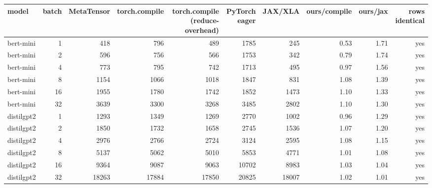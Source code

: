 \begin{tabular}{lrrrrrrrrr}
\toprule
model & batch & MetaTensor & torch.compile & torch.compile (reduce-overhead) & PyTorch eager & JAX/XLA & ours/compile & ours/jax & rows identical \\
\midrule
bert-mini & 1 & 418 & 796 & 489 & 1785 & 245 & 0.53 & 1.71 & yes \\
bert-mini & 2 & 596 & 756 & 566 & 1753 & 342 & 0.79 & 1.74 & yes \\
bert-mini & 4 & 773 & 795 & 742 & 1713 & 495 & 0.97 & 1.56 & yes \\
bert-mini & 8 & 1154 & 1066 & 1018 & 1847 & 831 & 1.08 & 1.39 & yes \\
bert-mini & 16 & 1955 & 1780 & 1742 & 1852 & 1473 & 1.10 & 1.33 & yes \\
bert-mini & 32 & 3639 & 3300 & 3268 & 3485 & 2802 & 1.10 & 1.30 & yes \\
distilgpt2 & 1 & 1293 & 1349 & 1269 & 2770 & 1002 & 0.96 & 1.29 & yes \\
distilgpt2 & 2 & 1850 & 1732 & 1658 & 2745 & 1536 & 1.07 & 1.20 & yes \\
distilgpt2 & 4 & 2976 & 2766 & 2724 & 3124 & 2595 & 1.08 & 1.15 & yes \\
distilgpt2 & 8 & 5137 & 5062 & 5010 & 5853 & 4771 & 1.01 & 1.08 & yes \\
distilgpt2 & 16 & 9364 & 9087 & 9063 & 10702 & 8983 & 1.03 & 1.04 & yes \\
distilgpt2 & 32 & 18263 & 17884 & 17850 & 20825 & 18007 & 1.02 & 1.01 & yes \\
\bottomrule
\end{tabular}
